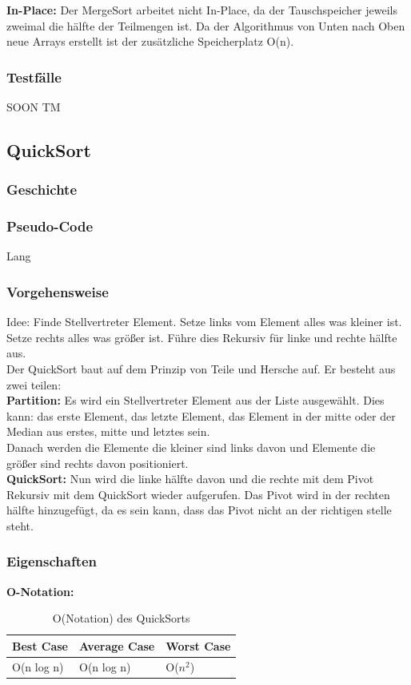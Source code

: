\documentclass{article}
\begin{document}
\textbf{In-Place:} Der MergeSort arbeitet nicht In-Place, da der Tauschspeicher jeweils zweimal die hälfte der Teilmengen ist. Da der Algorithmus von Unten nach Oben neue Arrays erstellt ist der zusätzliche Speicherplatz O(n).   \\
\subsubsection{Testfälle}
SOON TM
\subsection{QuickSort}
\subsubsection{Geschichte}
\subsubsection{Pseudo-Code}
Lang
\subsubsection{Vorgehensweise}
Idee: Finde Stellvertreter Element. Setze links vom Element alles was kleiner ist. Setze rechts alles was größer ist. Führe dies Rekursiv für linke und rechte hälfte aus.\\

Der QuickSort baut auf dem Prinzip von Teile und Hersche auf. Er besteht aus zwei teilen:\\
\textbf{Partition:} Es wird ein Stellvertreter Element aus der Liste ausgewählt. Dies kann: das erste Element, das letzte Element, das Element in der mitte oder der Median aus erstes, mitte und letztes sein.\\ Danach werden die Elemente die kleiner sind links davon und Elemente die größer sind rechts davon positioniert.\\
\textbf{QuickSort:} Nun wird die linke hälfte davon und die rechte mit dem Pivot Rekursiv mit dem QuickSort wieder aufgerufen. Das Pivot wird in der rechten hälfte hinzugefügt, da es sein kann, dass das Pivot nicht an der richtigen stelle steht.



\subsubsection{Eigenschaften}
\textbf{O-Notation:}
\begin{table}[h]
\centering
\begin{tabular}{lll}
	\hline
	\textbf{Best Case} & \textbf{Average Case} & \textbf{Worst Case} \\
	\hline
	O(n log n) & O(n log n) & O($n^{2}$) \\
	\hline
\end{tabular}
\caption{O(Notation) des QuickSorts \cite{ONotationen}}
\label{tab:QuickSort}
\end{table}
\end{document}
